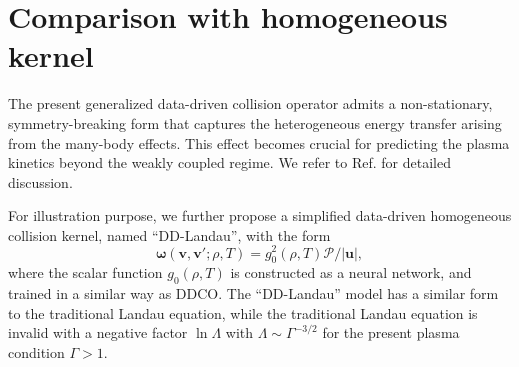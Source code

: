 \documentclass[preprint,1p,times]{elsarticle}
\theoremstyle{definition}
\theoremstyle{remark}
\begin{document}




\section{Comparison with homogeneous kernel} %
\label{app:comp_homo}

The present generalized data-driven collision operator admits a non-stationary, symmetry-breaking form that captures the heterogeneous energy transfer arising from the many-body effects. This effect becomes crucial for predicting the plasma kinetics beyond the weakly coupled regime. We refer to Ref. \cite{zhao2025data} for detailed discussion. 

For illustration purpose, we further propose a simplified data-driven homogeneous collision kernel, named ``DD-Landau'', with the form
\begin{equation}
     \bm{\omega} (\bm{v}, \bm{v}'; \rho, T) = g_{0}^{2}(\rho,T) \boldsymbol{\mathcal{P}} / |\bm{u}| ,
\label{eq:DD_Landau}     
\end{equation}
where the scalar function $g_{0}(\rho,T)$ is constructed as a neural network, and trained in a similar way as DDCO. 
The ``DD-Landau'' model has a similar form to the traditional Landau equation, while the traditional Landau equation is invalid with a negative factor $\ln \Lambda$ with $\Lambda \sim \Gamma^{-3/2}$ for the present plasma condition $\Gamma > 1$.  
%
\end{document}
